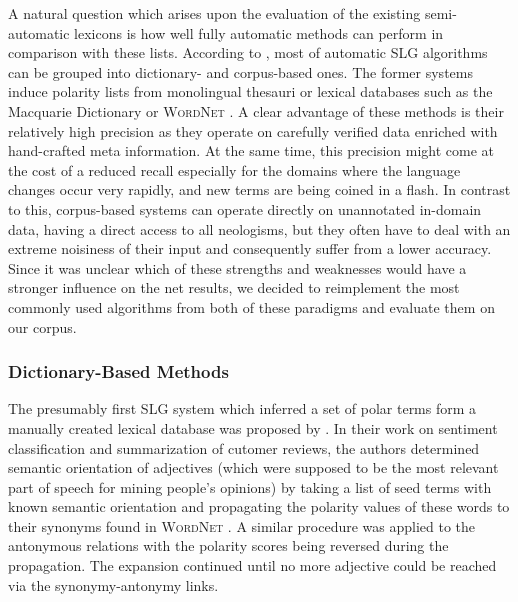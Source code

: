 A natural question which arises upon the evaluation of the existing
semi-automatic lexicons is how well fully automatic methods can
perform in comparison with these lists.  According to
\citet[p. 79]{Liu:12}, most of automatic SLG algorithms can be grouped
into dictionary- and corpus-based ones.  The former systems induce
polarity lists from monolingual thesauri or lexical databases such as
the Macquarie Dictionary \cite{Bernard:86} or \textsc{WordNet}
\cite{Miller:95}.  A clear advantage of these methods is their
relatively high precision as they operate on carefully verified data
enriched with hand-crafted meta information.  At the same time, this
precision might come at the cost of a reduced recall especially for
the domains where the language changes occur very rapidly, and new
terms are being coined in a flash.  In contrast to this, corpus-based
systems can operate directly on unannotated in-domain data, having a
direct access to all neologisms, but they often have to deal with an
extreme noisiness of their input and consequently suffer from a lower
accuracy.  Since it was unclear which of these strengths and
weaknesses would have a stronger influence on the net results, we
decided to reimplement the most commonly used algorithms from both of
these paradigms and evaluate them on our corpus.

\subsubsection{Dictionary-Based Methods}

The presumably first SLG system which inferred a set of polar terms
form a manually created lexical database was proposed by
\citet{Hu:04}.  In their work on sentiment classification and
summarization of cutomer reviews, the authors determined semantic
orientation of adjectives (which were supposed to be the most relevant
part of speech for mining people's opinions) by taking a list of seed
terms with known semantic orientation and propagating the polarity
values of these words to their synonyms found in \textsc{WordNet}
\cite{Miller:95}.  A similar procedure was applied to the antonymous
relations with the polarity scores being reversed during the
propagation.  The expansion continued until no more adjective could be
reached via the synonymy-antonymy links.

